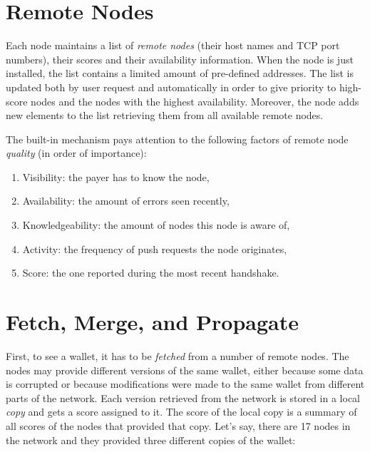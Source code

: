 \documentclass[11pt,oneside]{article}
\begin{document}
\section{Remote Nodes}

Each node maintains a list of \emph{remote nodes} (their host names and TCP port numbers),
their scores and their availability information. When the node is just installed,
the list contains a limited amount of pre-defined addresses. The list is
updated both by user request and automatically in order to give priority
to high-score nodes and the nodes with the highest availability.
Moreover, the node adds new elements to the list retrieving them from all
available remote nodes.

The built-in mechanism pays attention to the following factors of
remote node \emph{quality} (in order of importance):

\begin{enumerate}
  \item Visibility: the payer has to know the node,
  \item Availability: the amount of errors seen recently,
  \item Knowledgeability: the amount of nodes this node is aware of,
  \item Activity: the frequency of push requests the node originates,
  \item Score: the one reported during the most recent handshake.
\end{enumerate}

\section{Fetch, Merge, and Propagate}

First, to see a wallet, it has to be \emph{fetched} from a number of remote
nodes. The nodes may provide different versions of the same wallet, either
because some data is corrupted or because modifications were made to the same
wallet from different parts of the network. Each version retrieved from the
network is stored in a local \emph{copy} and gets a score assigned to it.
The score of the local copy is a summary of all scores of the nodes that
provided that copy. Let's say, there are 17 nodes in the network and they
provided three different copies of the wallet:
\end{document}
